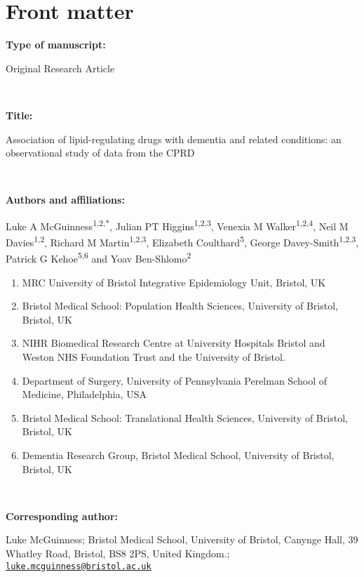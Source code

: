 \documentclass[
]{article}
\author{}
\date{\vspace{-2.5em}Manuscript last updated: 16 June, 2021}
\providecommand{\tightlist}{%
  \setlength{\itemsep}{0pt}\setlength{\parskip}{0pt}}
\begin{document}
{
\setcounter{tocdepth}{2}
\tableofcontents
}
\hypertarget{front-matter}{%
\section{Front matter}\label{front-matter}}

\textbf{Type of manuscript:}

Original Research Article

~

\textbf{Title: }

Association of lipid-regulating drugs with dementia and related conditions: an observational study of data from the CPRD

~

\textbf{Authors and affiliations:}

Luke A McGuinness\textsuperscript{1,2,*}, Julian PT Higgins\textsuperscript{1,2,3}, Venexia M Walker\textsuperscript{1,2,4}, Neil M Davies\textsuperscript{1,2}, Richard M Martin\textsuperscript{1,2,3}, Elizabeth Coulthard\textsuperscript{5}, George Davey-Smith\textsuperscript{1,2,3}, Patrick G Kehoe\textsuperscript{5,6} and Yoav Ben-Shlomo\textsuperscript{2}

\begin{enumerate}
\def\labelenumi{(\arabic{enumi})}
\tightlist
\item
  MRC University of Bristol Integrative Epidemiology Unit, Bristol, UK
\item
  Bristol Medical School: Population Health Sciences, University of Bristol, Bristol, UK
\item
  NIHR Biomedical Research Centre at University Hospitals Bristol and Weston NHS Foundation Trust and the University of Bristol.
\item
  Department of Surgery, University of Pennsylvania Perelman School of Medicine, Philadelphia, USA
\item
  Bristol Medical School: Translational Health Sciences, University of Bristol, Bristol, UK
\item
  Dementia Research Group, Bristol Medical School, University of Bristol, Bristol, UK
\end{enumerate}

~

\textbf{Corresponding author:}

Luke McGuinness; Bristol Medical School, University of Bristol,
Canynge Hall, 39 Whatley Road, Bristol, BS8 2PS, United Kingdom.; \href{mailto:luke.mcguinness@bristol.ac.uk}{\nolinkurl{luke.mcguinness@bristol.ac.uk}}
\end{document}
